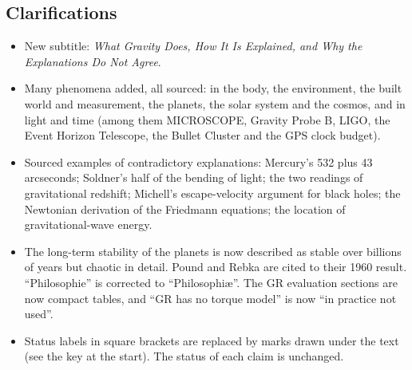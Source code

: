 \documentclass[11pt,a4paper]{article}
\begin{document}
\subsection*{Clarifications}
\begin{itemize}
  \item New subtitle: \emph{What Gravity Does, How It Is Explained, and Why the Explanations Do Not Agree}.
  \item Many phenomena added, all sourced: in the body, the environment, the built world and measurement, the planets, the solar system and the cosmos, and in light and time (among them MICROSCOPE, Gravity Probe B, LIGO, the Event Horizon Telescope, the Bullet Cluster and the GPS clock budget).
  \item Sourced examples of contradictory explanations: Mercury's 532 plus 43 arcseconds; Soldner's half of the bending of light; the two readings of gravitational redshift; Michell's escape-velocity argument for black holes; the Newtonian derivation of the Friedmann equations; the location of gravitational-wave energy.
  \item The long-term stability of the planets is now described as stable over billions of years but chaotic in detail. Pound and Rebka are cited to their 1960 result. ``Philosophie'' is corrected to ``Philosophi\ae''. The GR evaluation sections are now compact tables, and ``GR has no torque model'' is now ``in practice not used''.
  \item Status labels in square brackets are replaced by marks drawn under the text (see the key at the start). The status of each claim is unchanged.
\end{itemize}

\newpage


\end{document}
